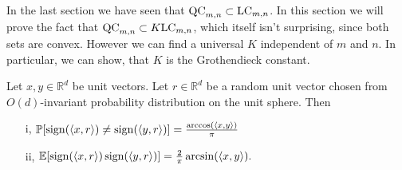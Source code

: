 In the last section we have seen that $\textup{QC}_{m,n}\subset \textup{LC}_{m,n}$. In this section we will prove the fact that $\textup{QC}_{m,n}\subset K\textup{LC}_{m,n}$, which itself isn't surprising, since both sets are convex. However we can find a universal $K$ independent of $m$ and $n$. In particular, we can show, that $K$ is the Grothendieck constant. 

\begin{lemma}\label{lem:G_id}
	Let $x,y\in\mathbb{R}^d$ be unit vectors. Let $r\in\mathbb{R}^d$ be a random unit vector chosen from $O(d)$-invariant probability distribution on the unit sphere. Then
	\begin{enumerate}
		\item[i,] $\mathbb{P}[\operatorname{sign}(\langle{x},{r}\rangle)\neq\operatorname{sign}(\langle{y},{r}\rangle)]=\frac{\arccos(\langle{x},{y}\rangle)}{\pi}$
		\item[ii,] $\mathbb{E}[\operatorname{sign}(\langle{x},{r}\rangle)\operatorname{sign}(\langle{y},{r}\rangle)]=\frac{2}{\pi}\arcsin(\langle{x},{y}\rangle).$
	\end{enumerate}
\end{lemma}
